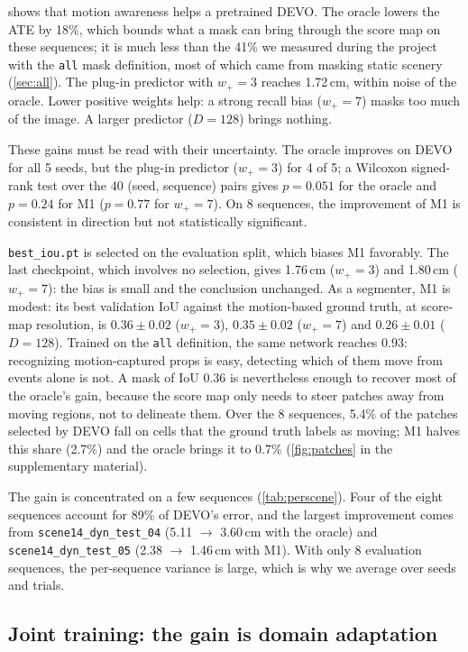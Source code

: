 \documentclass[conference]{IEEEtran}
\newcommand{\code}[1]{\texttt{#1}}
\newcommand{\wplus}{w_{+}}
\begin{document}
 shows that motion awareness helps a pretrained DEVO. The oracle
lowers the ATE by 18\%, which bounds what a mask can bring through the score map on these
sequences; it is much less than the 41\% we measured during the project with the
\code{all} mask definition, most of which came from masking static scenery
(\cref{sec:all}). The plug-in predictor with $\wplus = 3$ reaches 1.72\,cm, within noise
of the oracle. Lower positive weights help: a strong recall bias ($\wplus = 7$) masks too
much of the image. A larger predictor ($D = 128$) brings nothing.

These gains must be read with their uncertainty. The oracle improves on DEVO for all 5
seeds, but the plug-in predictor ($\wplus = 3$) for 4 of 5; a Wilcoxon signed-rank test
over the 40 (seed, sequence) pairs gives $p = 0.051$ for the oracle and $p = 0.24$ for M1
($p = 0.77$ for $\wplus = 7$). On 8 sequences, the improvement of M1 is consistent in
direction but not statistically significant.

\code{best\_iou.pt} is selected on the evaluation split, which biases M1 favorably. The
last checkpoint, which involves no selection, gives 1.76\,cm ($\wplus = 3$) and 1.80\,cm
($\wplus = 7$): the bias is small and the conclusion unchanged. As a segmenter, M1 is
modest: its best validation IoU against the motion-based ground truth, at score-map
resolution, is $0.36 \pm 0.02$ ($\wplus = 3$), $0.35 \pm 0.02$ ($\wplus = 7$) and
$0.26 \pm 0.01$ ($D = 128$). Trained on the \code{all} definition, the same network reaches
$0.93$: recognizing motion-captured props is easy, detecting which of them move from
events alone is not. A mask of IoU 0.36 is nevertheless enough to recover most of the
oracle's gain, because the score map only needs to steer patches away from moving regions,
not to delineate them. Over the 8 sequences, 5.4\% of the patches selected by DEVO fall on
cells that the ground truth labels as moving; M1 halves this share (2.7\%) and the oracle
brings it to 0.7\% (\cref{fig:patches} in the supplementary material).

The gain is concentrated on a few sequences (\cref{tab:perscene}). Four of the eight
sequences account for 89\% of DEVO's error, and the largest improvement comes from
\code{scene14\_dyn\_test\_04} (5.11 $\to$ 3.60\,cm with the oracle) and
\code{scene14\_dyn\_test\_05} (2.38 $\to$ 1.46\,cm with M1). With only 8 evaluation
sequences, the per-sequence variance is large, which is why we average over seeds and
trials.

\subsection{Joint training: the gain is domain adaptation}
\end{document}
